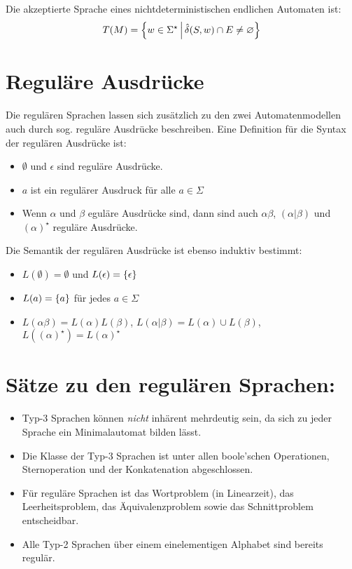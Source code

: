 Die akzeptierte Sprache eines nichtdeterministischen endlichen Automaten ist:
\begin{equation*}
	T(M)=\left\{ w\in\Sigma^\star \,\middle|\, \hat\delta(S,w)\cap E\neq \varnothing \right\}
\end{equation*}

\section{Reguläre Ausdrücke}
Die regulären Sprachen lassen sich zusätzlich zu den zwei Automatenmodellen auch durch sog. reguläre Ausdrücke beschreiben. Eine Definition für die Syntax der regulären Ausdrücke ist:
\begin{itemize}
	\item $\emptyset$ und $\epsilon$ sind reguläre Ausdrücke.
	\item $a$ ist ein regulärer Ausdruck für alle $a\in\Sigma$
	\item Wenn $\alpha$ und $\beta$ eguläre Ausdrücke sind, dann sind auch $\alpha\beta$, $(\alpha|\beta)$ und $(\alpha)^\star$ reguläre Ausdrücke.
\end{itemize}
Die Semantik der regulären Ausdrücke ist ebenso induktiv bestimmt:
\begin{itemize}
	\item $L(\emptyset)=\emptyset$ und $L(\epsilon)=\left\{ \epsilon \right\}$
	\item $L(a)=\left\{ a \right\}$ für jedes $a\in\Sigma$
	\item $L(\alpha \beta)=L(\alpha)L(\beta)$, $L(\alpha|\beta)=L(\alpha)\cup L(\beta)$, $L((\alpha)^\star)=L(\alpha)^\star$
\end{itemize}






\section{Sätze zu den regulären Sprachen:}
\begin{itemize}
	\item Typ-3 Sprachen können \emph{nicht} inhärent mehrdeutig sein, da sich zu jeder Sprache ein Minimalautomat bilden lässt.
	\item Die Klasse der Typ-3 Sprachen ist unter allen boole'schen Operationen, Sternoperation und der Konkatenation abgeschlossen.
	\item Für reguläre Sprachen ist das Wortproblem (in Linearzeit), das Leerheitsproblem, das Äquivalenzproblem sowie das Schnittproblem entscheidbar.
	\item Alle Typ-2 Sprachen über einem einelementigen Alphabet sind bereits regulär.
\end{itemize}
